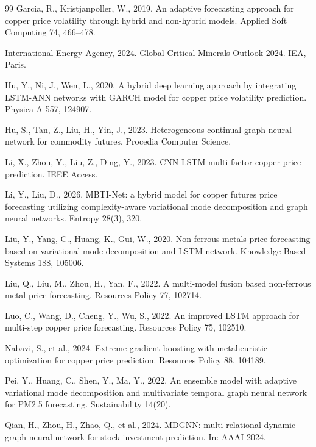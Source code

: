 \documentclass[journal]{IEEEtran}
\begin{document}
\begin{thebibliography}{99}
Garcia, R., Kristjanpoller, W., 2019. An adaptive forecasting approach for copper price volatility through hybrid and non-hybrid models. Applied Soft Computing 74, 466--478.

International Energy Agency, 2024. Global Critical Minerals Outlook 2024. IEA, Paris.

Hu, Y., Ni, J., Wen, L., 2020. A hybrid deep learning approach by integrating LSTM-ANN networks with GARCH model for copper price volatility prediction. Physica A 557, 124907.

Hu, S., Tan, Z., Liu, H., Yin, J., 2023. Heterogeneous continual graph neural network for commodity futures. Procedia Computer Science.

Li, X., Zhou, Y., Liu, Z., Ding, Y., 2023. CNN-LSTM multi-factor copper price prediction. IEEE Access.

Li, Y., Liu, D., 2026. MBTI-Net: a hybrid model for copper futures price forecasting utilizing complexity-aware variational mode decomposition and graph neural networks. Entropy 28(3), 320.

Liu, Y., Yang, C., Huang, K., Gui, W., 2020. Non-ferrous metals price forecasting based on variational mode decomposition and LSTM network. Knowledge-Based Systems 188, 105006.

Liu, Q., Liu, M., Zhou, H., Yan, F., 2022. A multi-model fusion based non-ferrous metal price forecasting. Resources Policy 77, 102714.

Luo, C., Wang, D., Cheng, Y., Wu, S., 2022. An improved LSTM approach for multi-step copper price forecasting. Resources Policy 75, 102510.

Nabavi, S., et al., 2024. Extreme gradient boosting with metaheuristic optimization for copper price prediction. Resources Policy 88, 104189.

Pei, Y., Huang, C., Shen, Y., Ma, Y., 2022. An ensemble model with adaptive variational mode decomposition and multivariate temporal graph neural network for PM2.5 forecasting. Sustainability 14(20).

Qian, H., Zhou, H., Zhao, Q., et al., 2024. MDGNN: multi-relational dynamic graph neural network for stock investment prediction. In: AAAI 2024.


\end{thebibliography}
\end{document}
